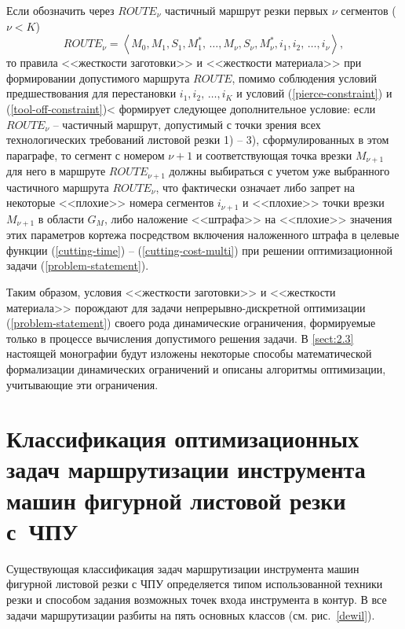 \documentclass[11pt,twoside,openany]{report}
\newcounter{lem}
\begin{document}
Если обозначить через
$ROUTE_\nu$
частичный маршрут резки первых $\nu$
сегментов
($\nu < K$)
$$
  ROUTE_\nu = \left<
    M_0, M_1, S_1, M_1^*, \,\dots, M_\nu, S_\nu, M_\nu^*,
    i_1, i_2, \,\dots, i_\nu
  \right>
  ,
$$
то правила <<жесткости заготовки>> и <<жесткости материала>>
при формировании допустимого маршрута
$ROUTE$,
помимо соблюдения условий предшествования для перестановки
$i_1, i_2, \,\dots, i_K$
и условий (\ref{pierce-constraint}) и (\ref{tool-off-constraint})<
формирует следующее дополнительное условие:
если
$ROUTE_\nu$ -- частичный маршрут,
допустимый с точки зрения всех технологических
требований листовой резки 1) -- 3),
сформулированных в этом параграфе,
то сегмент с номером $\nu+1$
и соответствующая точка врезки $M_{\nu+1}$
для него в маршруте
$ROUTE_{\nu+1}$
должны выбираться с учетом уже выбранного частичного маршрута
$ROUTE_\nu$,
что фактически означает либо запрет
на некоторые <<плохие>> номера сегментов
$i_{\nu+1}$
и <<плохие>> точки врезки
$M_{\nu+1}$
в области  $G_M$,
либо наложение <<штрафа>> на <<плохие>> значения
этих параметров кортежа
посредством включения наложенного штрафа в целевые функции
(\ref{cutting-time}) -- (\ref{cutting-cost-multi})
при решении оптимизационной задачи (\ref{problem-statement}).

Таким образом,
условия <<жесткости заготовки>> и <<жесткости материала>>
порождают для задачи непрерывно-дискретной оптимизации (\ref{problem-statement})
своего рода динамические ограничения,
формируемые только в процессе вычисления допустимого решения задачи.
В \ref{sect:2.3}
настоящей монографии будут изложены
некоторые способы математической формализации динамических ограничений
и описаны алгоритмы оптимизации,
учитывающие эти ограничения.

{\raggedright\section{
  Классификация оптимизационных задач
  маршрутизации инструмента
  машин фигурной листовой резки с~ЧПУ
}}
\label{sect:1.4}
\setcounter{equation}{0}

Существующая  классификация задач маршрутизации инструмента
машин фигурной листовой резки с ЧПУ определяется
типом использованной техники резки и способом задания
возможных точек входа инструмента в контур.
В \cite{intro13}
все задачи маршрутизации разбиты на пять основных классов
(см. рис.~\ref{dewil}).
\end{document}
